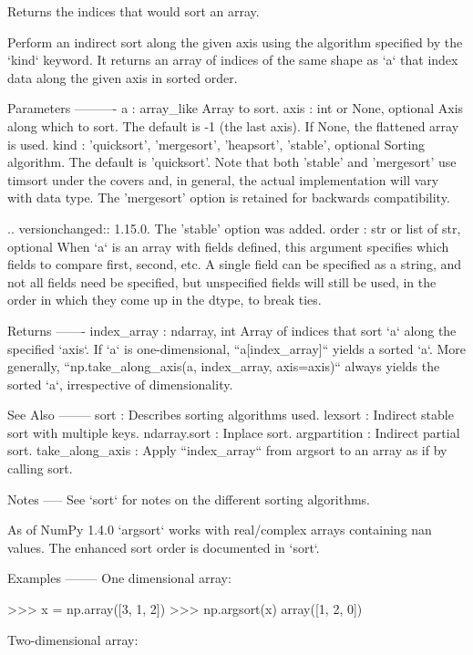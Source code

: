\begin{DoxyVerb}Returns the indices that would sort an array.

Perform an indirect sort along the given axis using the algorithm specified
by the `kind` keyword. It returns an array of indices of the same shape as
`a` that index data along the given axis in sorted order.

Parameters
----------
a : array_like
    Array to sort.
axis : int or None, optional
    Axis along which to sort.  The default is -1 (the last axis). If None,
    the flattened array is used.
kind : {'quicksort', 'mergesort', 'heapsort', 'stable'}, optional
    Sorting algorithm. The default is 'quicksort'. Note that both 'stable'
    and 'mergesort' use timsort under the covers and, in general, the
    actual implementation will vary with data type. The 'mergesort' option
    is retained for backwards compatibility.

    .. versionchanged:: 1.15.0.
       The 'stable' option was added.
order : str or list of str, optional
    When `a` is an array with fields defined, this argument specifies
    which fields to compare first, second, etc.  A single field can
    be specified as a string, and not all fields need be specified,
    but unspecified fields will still be used, in the order in which
    they come up in the dtype, to break ties.

Returns
-------
index_array : ndarray, int
    Array of indices that sort `a` along the specified `axis`.
    If `a` is one-dimensional, ``a[index_array]`` yields a sorted `a`.
    More generally, ``np.take_along_axis(a, index_array, axis=axis)``
    always yields the sorted `a`, irrespective of dimensionality.

See Also
--------
sort : Describes sorting algorithms used.
lexsort : Indirect stable sort with multiple keys.
ndarray.sort : Inplace sort.
argpartition : Indirect partial sort.
take_along_axis : Apply ``index_array`` from argsort
                  to an array as if by calling sort.

Notes
-----
See `sort` for notes on the different sorting algorithms.

As of NumPy 1.4.0 `argsort` works with real/complex arrays containing
nan values. The enhanced sort order is documented in `sort`.

Examples
--------
One dimensional array:

>>> x = np.array([3, 1, 2])
>>> np.argsort(x)
array([1, 2, 0])

Two-dimensional array:


\end{DoxyVerb}
